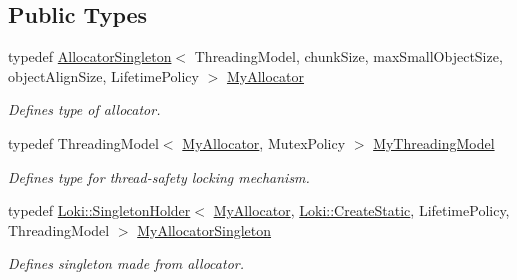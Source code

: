 \subsection*{Public Types}
\begin{DoxyCompactItemize}
\item 
\hypertarget{classLoki_1_1AllocatorSingleton_a47fa2a9f8348fc8ce749221f7bfa7245}{}typedef \hyperlink{classLoki_1_1AllocatorSingleton}{Allocator\+Singleton}$<$ Threading\+Model, chunk\+Size, max\+Small\+Object\+Size, object\+Align\+Size, Lifetime\+Policy $>$ \hyperlink{classLoki_1_1AllocatorSingleton_a47fa2a9f8348fc8ce749221f7bfa7245}{My\+Allocator}\label{classLoki_1_1AllocatorSingleton_a47fa2a9f8348fc8ce749221f7bfa7245}

\begin{DoxyCompactList}\small\item\em Defines type of allocator. \end{DoxyCompactList}\item 
\hypertarget{classLoki_1_1AllocatorSingleton_ac9fde708e2ee0bf990c3eaa34422ca25}{}typedef Threading\+Model$<$ \hyperlink{classLoki_1_1AllocatorSingleton_a47fa2a9f8348fc8ce749221f7bfa7245}{My\+Allocator}, Mutex\+Policy $>$ \hyperlink{classLoki_1_1AllocatorSingleton_ac9fde708e2ee0bf990c3eaa34422ca25}{My\+Threading\+Model}\label{classLoki_1_1AllocatorSingleton_ac9fde708e2ee0bf990c3eaa34422ca25}

\begin{DoxyCompactList}\small\item\em Defines type for thread-\/safety locking mechanism. \end{DoxyCompactList}\item 
\hypertarget{classLoki_1_1AllocatorSingleton_a74b23f8327ce4f3d795aa20240deb99e}{}typedef \hyperlink{classLoki_1_1SingletonHolder}{Loki\+::\+Singleton\+Holder}$<$ \hyperlink{classLoki_1_1AllocatorSingleton_a47fa2a9f8348fc8ce749221f7bfa7245}{My\+Allocator}, \hyperlink{structLoki_1_1CreateStatic}{Loki\+::\+Create\+Static}, Lifetime\+Policy, Threading\+Model $>$ \hyperlink{classLoki_1_1AllocatorSingleton_a74b23f8327ce4f3d795aa20240deb99e}{My\+Allocator\+Singleton}\label{classLoki_1_1AllocatorSingleton_a74b23f8327ce4f3d795aa20240deb99e}

\begin{DoxyCompactList}\small\item\em Defines singleton made from allocator. \end{DoxyCompactList}\end{DoxyCompactItemize}
